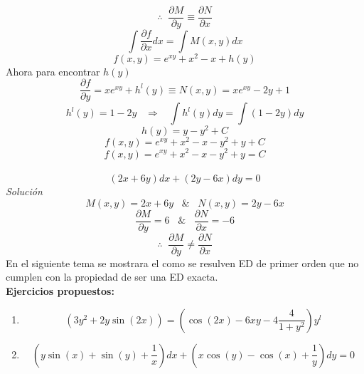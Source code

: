 \documentclass[10pt,executivepaper]{article}
\begin{document}
\[\therefore\;\;\frac{\partial{M}}{\partial{y}}\equiv\frac{\partial{N}}{\partial{x}}\]
\[\int\frac{\partial{f}}{\partial{x}}dx=\int M(x,y)dx\]
\[f(x,y)=e^{xy}+x^{2}-x+h(y)\]
Ahora para encontrar $h(y)$
\[\frac{\partial{f}}{\partial{y}}=xe^{xy}+h^{l}(y)\equiv N(x,y)=xe^{xy}-2y+1\]
\[h^{l}(y)=1-2y\;\;\;\Rightarrow\;\;\;\int h^{l}(y)dy=\int(1-2y)dy\]
\[h(y)=y-y^{2}+C\]
\[f(x,y)=e^{xy}+x^{2}-x-y^{2}+y+C\]
\[f(x,y)=e^{xy}+x^{2}-x-y^{2}+y=C\]
\vspace{0.5cm}\\
\[(2x+6y)dx+(2y-6x)dy=0\]
\textit{Solución}
\[M(x,y)=2x+6y\;\;\;\&\;\;\;N(x,y)=2y-6x\]
\[\frac{\partial{M}}{\partial{y}}=6\;\;\;\&\;\;\;\frac{\partial{N}}{\partial{x}}=-6\]
\[\therefore\;\;\frac{\partial{M}}{\partial{y}}\neq\frac{\partial{N}}{\partial{x}}\]
En el siguiente tema se mostrara el como se resulven ED de primer orden que no cumplen con la propiedad de ser una ED exacta.
\vspace{1.5cm}\\
\textbf{Ejercicios propuestos:}
\begin{enumerate}
  \item \[(3y^{2}+2y\sin(2x))=\left(\cos(2x)-6xy-4\frac{4}{1+y^{2}}\right)y^{l}\]
  \item \[\left(y\sin(x)+\sin(y)+\frac{1}{x}\right)dx+\left(x\cos(y)-\cos(x)+\frac{1}{y}\right)dy=0\]
\end{enumerate}
\clearpage
\end{document}
